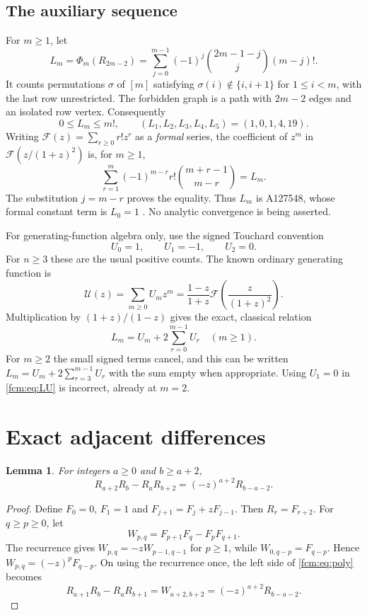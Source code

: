 \documentclass[11pt,letterpaper]{article}
\newtheorem{lemma}[theorem]{Lemma}
\theoremstyle{remark}\newtheorem{remark}[theorem]{Remark}
\begin{document}
\subsection{The auxiliary sequence}
For $m\ge1$, let
\begin{equation}\label{fcm:eq:L}
 L_m=\Phi_m(R_{2m-2})
 =\sum_{j=0}^{m-1}(-1)^j\binom{2m-1-j}{j}(m-j)!.
\end{equation}
It counts permutations $\sigma$ of $[m]$ satisfying $\sigma(i)\notin\{i,i+1\}$ for $1\le i<m$, with the last row unrestricted. The forbidden graph is a path with $2m-2$ edges and an isolated row vertex. Consequently
\begin{equation}\label{fcm:eq:Lbounds}
 0\le L_m\le m!,\qquad (L_1,L_2,L_3,L_4,L_5)=(1,0,1,4,19).
\end{equation}
Writing $\mathcal F(z)=\sum_{r\ge0}r!z^r$ as a \emph{formal} series, the coefficient of $z^m$ in $\mathcal F(z/(1+z)^2)$ is, for $m\ge1$,
\[
 \sum_{r=1}^m(-1)^{m-r}r!\binom{m+r-1}{m-r}=L_m.
\]
The substitution $j=m-r$ proves the equality. Thus $L_m$ is A127548, whose formal constant term is $L_0=1$ \cite{oeis127548}. No analytic convergence is being asserted.

For generating-function algebra only, use the signed Touchard convention
\begin{equation}\label{fcm:eq:signed}U_0=1,\qquad U_1=-1,\qquad U_2=0.\end{equation}
For $n\ge3$ these are the usual positive counts. The known ordinary generating function \cite{oeis179,wm} is
\[
 \mathcal U(z)=\sum_{m\ge0}U_mz^m
 =\frac{1-z}{1+z}\mathcal F\left(\frac{z}{(1+z)^2}\right).
\]
Multiplication by $(1+z)/(1-z)$ gives the exact, classical relation
\begin{equation}\label{fcm:eq:LU}
 L_m=U_m+2\sum_{r=0}^{m-1}U_r\quad(m\ge1).
\end{equation}
For $m\ge2$ the small signed terms cancel, and this can be written $L_m=U_m+2\sum_{r=3}^{m-1}U_r$ with the sum empty when appropriate. Using $U_1=0$ in \eqref{fcm:eq:LU} is incorrect, already at $m=2$.

\section{Exact adjacent differences}
\begin{lemma}\label{fcm:lem:poly}
For integers $a\ge0$ and $b\ge a+2$,
\begin{equation}\label{fcm:eq:poly}
 R_{a+2}R_b-R_aR_{b+2}=(-z)^{a+2}R_{b-a-2}.
\end{equation}
\end{lemma}
\begin{proof}
Define $F_0=0$, $F_1=1$ and $F_{j+1}=F_j+zF_{j-1}$. Then $R_r=F_{r+2}$. For $q\ge p\ge0$, let
\[
 W_{p,q}=F_{p+1}F_q-F_pF_{q+1}.
\]
The recurrence gives $W_{p,q}=-zW_{p-1,q-1}$ for $p\ge1$, while $W_{0,q-p}=F_{q-p}$. Hence $W_{p,q}=(-z)^pF_{q-p}$. On using the recurrence once, the left side of \eqref{fcm:eq:poly} becomes
\[
 R_{a+1}R_b-R_aR_{b+1}=W_{a+2,b+2}=(-z)^{a+2}R_{b-a-2}.
\]
\end{proof}
\end{document}
